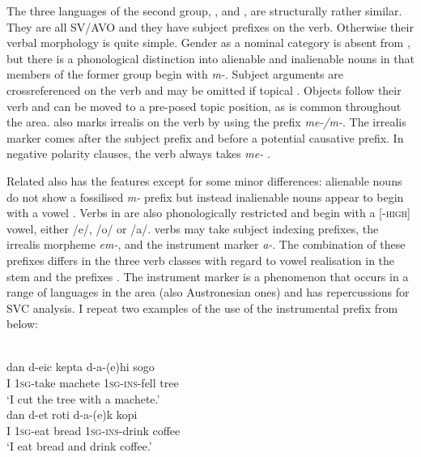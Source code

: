 The three languages of the second group, ,  and , are structurally rather similar. They are all SV/AVO and they have subject prefixes on the verb. Otherwise their verbal morphology is quite simple. Gender as a nominal category is absent from , but there is a phonological distinction into alienable and inalienable nouns in that members of the former group begin with \textit{m-}. Subject arguments are crossreferenced on the verb and may be omitted if topical \citep[269]{gravelle2010grammar}. Objects follow their verb and can be moved to a pre-posed topic position, as is common throughout the area.  also marks irrealis on the verb by using the prefix \textit{me-/m-}. The irrealis marker comes after the subject prefix and before a potential causative prefix. In negative polarity clauses, the verb always takes \textit{me-} \citep[110]{gravelle2010grammar}. 

Related  also has the  features except for some minor differences: alienable nouns do not show a fossilised \textit{m-} prefix but instead inalienable nouns appear to begin with a vowel \citep[218]{reesink2002grammar}. Verbs in  are also phonologically restricted and begin with a [-\textsc{high}] vowel, either /e/, /o/ or /a/.  verbs may take subject indexing prefixes, the irrealis morpheme \textit{em-}, and the instrument marker \textit{a-}. The combination of these prefixes differs in the three verb classes with regard to vowel realisation in the stem and the prefixes \citep{reesink2002grammar}. The instrument marker is a phenomenon that occurs in a range of languages in the area (also Austronesian ones) and has repercussions for SVC analysis. I repeat two examples of the use of the instrumental prefix from \citet{reesink2002grammar} below:

\ea
{}\\
\ea
\gll dan d-eic kepta d-a-(e)hi sogo \\
I \textsc{1}\textsc{sg}-take machete \textsc{1}\textsc{sg}-\textsc{ins}-fell tree \\
\glft `I cut the tree with a machete.' \\ 
\ex \label{sougb1}
\gll dan d-et roti d-a-(e)k kopi \\ 
I \textsc{1}\textsc{sg}-eat bread \textsc{1}\textsc{sg}-\textsc{ins}-drink coffee \\
\glft `I eat bread and drink coffee.'
\z
\z

